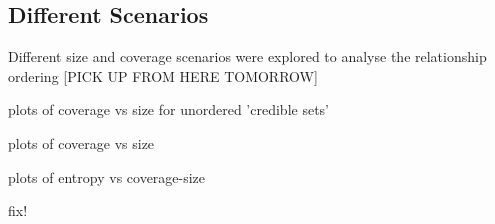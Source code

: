 \subsection{Different Scenarios} 

Different size and coverage scenarios were explored to analyse the relationship ordering [PICK UP FROM HERE TOMORROW]

plots of coverage vs size for unordered 'credible sets'

plots of coverage vs size

plots of entropy vs coverage-size

fix!